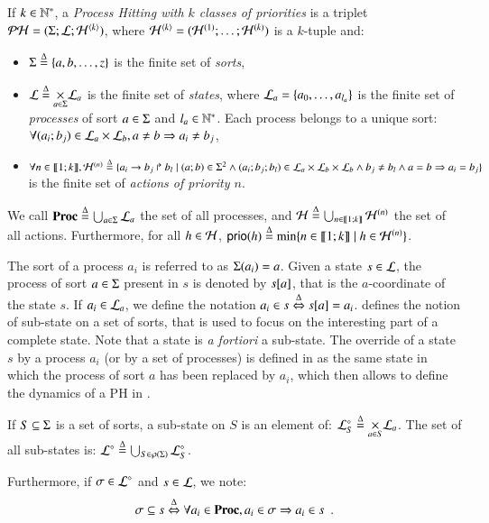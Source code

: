 \begin{definition}
\label{def:ph}
  If $k \in \sN^*$, a \emph{Process Hitting with $k$ classes of priorities} is a triplet $\PH = (\PHs; \PHl; \PHa^{\langle k \rangle})$,
  where $\PHa^{\langle k \rangle} = (\PHa^{(1)}; \dots; \PHa^{(k)})$ is a $k$-tuple and:
  \begin{itemize}
    \item $\PHs \DEF \{a, b, \dots, z\}$ is the finite set of \emph{sorts},
    \item $\PHl \DEF \underset{a \in \PHs}{\times} \PHl_a$ is the finite set of \emph{states}, where $\PHl_a = \{a_0, \ldots, a_{l_a}\}$ is the finite set of \emph{processes} of sort $a \in \PHs$ and $l_a \in \sN^*$. Each process belongs to a unique sort: $\forall (a_i; b_j) \in \PHl_a \times \PHl_b, a \neq b \Rightarrow a_i \neq b_j$,
    \item $\forall n \in \llbracket 1; k \rrbracket, \PHa^{(n)} \DEF \{\PHfrappe{a_i}{b_j}{b_l} \mid (a; b) \in \PHs^2 \wedge (a_i; b_j; b_l) \in \PHl_a \times \PHl_b \times \PHl_b \wedge b_j \neq b_l \wedge a = b \Rightarrow a_i = b_j \}$ is the finite set of \emph{actions of priority $n$}.
  \end{itemize}
  We call $\PHproc \DEF \bigcup_{a \in \PHs} \PHl_a$ the set of all processes, and $\PHh \DEF \bigcup_{n \in \segm{1}{k}} \PHh^{(n)}$ the set of all actions.
  Furthermore, for all $h \in \PHh$,
  $\prio(h) \DEF \min\{ n \in \segm{1}{k} \mid h \in \PHh^{(n)} \}$.
\end{definition}
%
\noindent
The sort of a process $a_i$ is referred to as $\PHsort(a_i) = a$.
Given a state $s\in \PHl$, the process of sort $a \in \PHs$ present in $s$ is denoted by $\PHget{s}{a}$, that is the $a$-coordinate of the state $s$.
If $a_i \in \PHl_a$, we define the notation $a_i \in s \EQDEF \PHget{s}{a} = a_i$.
 defines the notion of sub-state on a set of sorts, that is used to focus on the interesting part of a complete state.
Note that a state is \textit{a fortiori} a sub-state.
The override of a state $s$ by a process $a_i$ (or by a set of processes)
is defined in  as the same state in which the process of sort $a$ has been replaced by $a_i$,
which then allows to define the dynamics of a PH in .
%
\begin{definition}
\label{def:substate}
  If $S \subseteq \PHs$ is a set of sorts, a sub-state on $S$ is an element of:
  $\PHsubl[\PHl]_S \DEF \bigtimes{a \in S} \PHl_a$.
  The set of all sub-states is:
  $\PHsubl[\PHl] \DEF \bigcup_{S \in\powerset(\PHs)} \PHsubl[\PHl]_S$.
  
  \noindent
  Furthermore, if $\mysigma \in \PHsubl[\PHl]$ and $s \in \PHl$, we note:
    \[\mysigma \subseteq s \EQDEF \forall a_i \in \Proc, a_i \in \mysigma \Rightarrow a_i \in s \enspace.\]
\end{definition}
